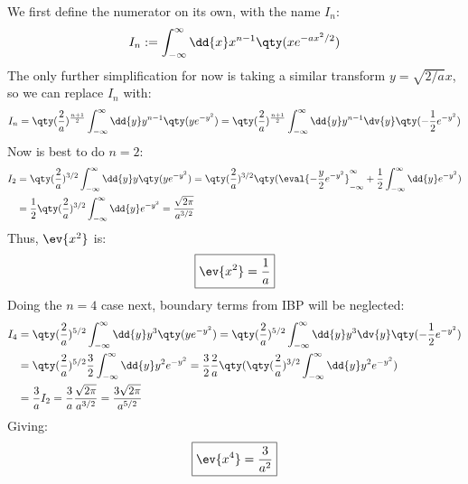\documentclass[12pt]{article}
\begin{document}
We first define the numerator on its own, with the name $I_n$:
\begin{align*}
  I_n:=\int_{-\infty}^\infty\dd{x}x^{n-1}\qty(x e^{-ax^2/2})
\end{align*}
The only further simplification for now is taking a similar transform $y=\sqrt{2/a}x$, so we can replace $I_n$ with:
\begin{align*}
  I_n=\qty(\frac2a)^{\frac{n+1}2}\int_{-\infty}^\infty\dd{y}y^{n-1}\qty(ye^{-y^2})
  =\qty(\frac2a)^{\frac{n+1}2}\int_{-\infty}^\infty\dd{y}y^{n-1}\dv{y}\qty(-\frac12e^{-y^2})
\end{align*}
Now is best to do $n=2$:
\begin{align*}
  I_2&=\qty(\frac2a)^{3/2}\int_{-\infty}^\infty\dd{y}y\qty(ye^{-y^2})
  =\qty(\frac2a)^{3/2}\qty(\eval{-\frac{y}{2}e^{-y^2}}_{-\infty}^\infty+\frac12\int_{-\infty}^\infty\dd{y}e^{-y^2})\\
  &=\frac12\qty(\frac2a)^{3/2}\int_{-\infty}^\infty\dd{y}e^{-y^2}=\frac{\sqrt{2\pi}}{a^{3/2}}
\end{align*}
Thus, $\ev{x^2}$ is:
\begin{align}
  \boxed{\ev{x^2}=\frac1a}
\end{align}
Doing the $n=4$ case next, boundary terms from IBP will be neglected:
\begin{align*}
  I_4&=\qty(\frac2a)^{5/2}\int_{-\infty}^\infty\dd{y}y^{3}\qty(ye^{-y^2})
  =\qty(\frac2a)^{5/2}\int_{-\infty}^\infty\dd{y}y^{3}\dv{y}\qty(-\frac12e^{-y^2})\\
  &=\qty(\frac2a)^{5/2}\frac32\int_{-\infty}^\infty\dd{y}y^{2}e^{-y^2}
  =\frac32\frac2a\qty(\qty(\frac2a)^{3/2}\int_{-\infty}^\infty\dd{y}y^2e^{-y^2})\\
  &=\frac3aI_2=\frac3a\frac{\sqrt{2\pi}}{a^{3/2}}=\frac{3\sqrt{2\pi}}{a^{5/2}}
\end{align*}
Giving:
\begin{align}
  \boxed{\ev{x^4}=\frac{3}{a^2}}
\end{align}
\end{document}
